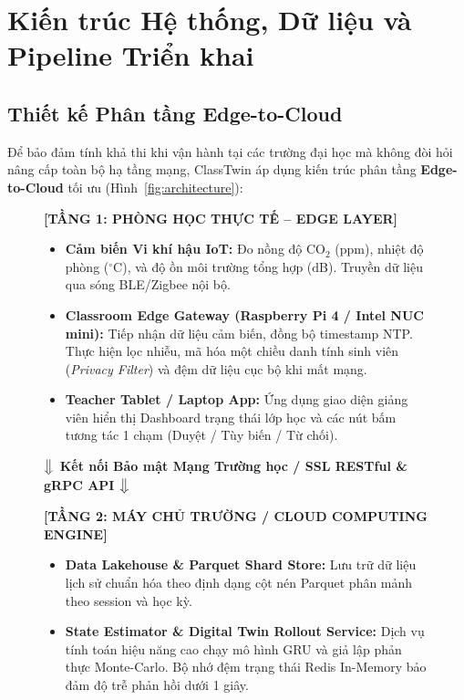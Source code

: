 \section{Kiến trúc Hệ thống, Dữ liệu và Pipeline Triển khai}\label{sec:kien-truc-ky-thuat}

\subsection{Thiết kế Phân tầng Edge-to-Cloud}\label{subsec:edge-to-cloud}
Để bảo đảm tính khả thi khi vận hành tại các trường đại học mà không đòi hỏi nâng cấp toàn bộ hạ tầng mạng, ClassTwin áp dụng kiến trúc phân tầng \textbf{Edge-to-Cloud} tối ưu (Hình~\ref{fig:architecture}):

\begin{figure}[htbp]
  \centering
  \begin{tcolorbox}[colback=white, colframe=TealPrimary, boxrule=1pt, arc=3pt, width=0.98\textwidth]
    \small
    \textbf{[TẦNG 1: PHÒNG HỌC THỰC TẾ -- EDGE LAYER]}
    \begin{itemize}[leftmargin=1.5em]
      \item \textbf{Cảm biến Vi khí hậu IoT:} Đo nồng độ $\text{CO}_2$ (ppm), nhiệt độ phòng ($^\circ\text{C}$), và độ ồn môi trường tổng hợp ($\text{dB}$). Truyền dữ liệu qua sóng BLE/Zigbee nội bộ.
      \item \textbf{Classroom Edge Gateway (Raspberry Pi 4 / Intel NUC mini):} Tiếp nhận dữ liệu cảm biến, đồng bộ timestamp NTP. Thực hiện lọc nhiễu, mã hóa một chiều danh tính sinh viên (\textit{Privacy Filter}) và đệm dữ liệu cục bộ khi mất mạng.
      \item \textbf{Teacher Tablet / Laptop App:} Ứng dụng giao diện giảng viên hiển thị Dashboard trạng thái lớp học và các nút bấm tương tác 1 chạm (Duyệt / Tùy biến / Từ chối).
    \end{itemize}
    \vspace{1mm}
    \centering\textbf{$\big\Downarrow$ Kết nối Bảo mật Mạng Trường học / SSL RESTful \& gRPC API $\big\Downarrow$}
    \vspace{1mm}
    \raggedright
    \textbf{[TẦNG 2: MÁY CHỦ TRƯỜNG / CLOUD COMPUTING ENGINE]}
    \begin{itemize}[leftmargin=1.5em]
      \item \textbf{Data Lakehouse \& Parquet Shard Store:} Lưu trữ dữ liệu lịch sử chuẩn hóa theo định dạng cột nén Parquet phân mảnh theo session và học kỳ.
      \item \textbf{State Estimator \& Digital Twin Rollout Service:} Dịch vụ tính toán hiệu năng cao chạy mô hình GRU và giả lập phản thực Monte-Carlo. Bộ nhớ đệm trạng thái Redis In-Memory bảo đảm độ trễ phản hồi dưới 1 giây.

\end{itemize}
\end{tcolorbox}
\end{figure}
